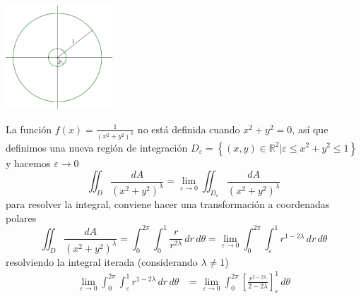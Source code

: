 \documentclass{article}
\begin{document}
\begin{enumerate}
{{            \color{azul}
            \begin{center}
                \includegraphics[width=4cm]{img/ej7.png}
            \end{center}
            La función $\displaystyle f(x)=\frac{1}{(x^2+y^2)^\lambda}$ no está
            definida cuando $x^2+y^2=0$, así que definimos una nueva región de
            integración $D_\varepsilon = \left\{(x,y)\in\mathbb{R}^2 |
            \varepsilon\leq x^2+y^2\leq 1\right\}$ y hacemos $\varepsilon
            \to 0$
            \[
                \iint_D {\frac{dA}{\left(x^2+y^2\right)^\lambda}}
                =\lim_{\varepsilon\to 0}{
                    \iint_{D_\varepsilon}{
                        \frac{dA}{\left(x^2+y^2\right)^\lambda}
                    }
                }
            \]
            para resolver la integral, conviene hacer una transformación a
            coordenadas polares
            \[
                \iint_D {\frac{dA}{\left(x^2+y^2\right)^\lambda}}
                =\int_{0}^{2\pi}{
                    \int_{0}^{1}{
                        \frac{r}{r^{2\lambda}}
                    \,dr}
                \,d\theta}
                =\lim_{\varepsilon\to 0}{
                    \int_{0}^{2\pi}{
                        \int_{\varepsilon}^{1}{
                            r^{1-2\lambda}
                        \,dr}
                    \,d\theta}
                }
            \]
            resolviendo la integral iterada (considerando $\lambda \ne 1$)
            \begin{align*}
                \lim_{\varepsilon\to 0}{
                    \int_{0}^{2\pi}{
                        \int_{\varepsilon}^{1}{
                            r^{1-2\lambda}
                        \,dr}
                    \,d\theta}
                }
                &=\lim_{\varepsilon\to 0}{
                    \int_{0}^{2\pi}{
                        \left[
                            \frac{r^{2-2\lambda}}
                                 {2-2\lambda}
                        \right]_{\varepsilon}^{1}
                    \,d\theta}
                }\\[.2cm]

\end{align*}}}
\end{enumerate}
\end{document}
